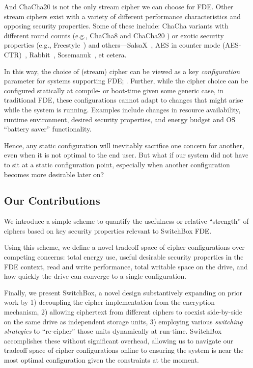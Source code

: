 And ChaCha20 is not the only stream cipher we can choose for FDE. Other stream
ciphers exist with a variety of different performance characteristics and
opposing security properties. Some of these include: ChaCha variants with
different round counts (e.g., ChaCha8 \cite{ChaCha8} and ChaCha20
\cite{ChaCha20}) or exotic security properties (e.g.,
Freestyle~\cite{Freestyle}) and others---SalsaX~\cite{SalsaX}, AES in counter
mode (AES-CTR)~\cite{AES-CTR}, Rabbit~\cite{Rabbit}, Sosemanuk~\cite{Sosemanuk},
et cetera.

In this way, the choice of (stream) cipher can be viewed as a key
\emph{configuration} parameter for systems supporting FDE; . Further, while the cipher choice can be configured
statically at compile- or boot-time given some generic case, in traditional FDE,
these configurations cannot adapt to changes that might arise while the system
is running. Examples include changes in resource availability, runtime
environment, desired security properties, and energy budget and OS ``battery
saver'' functionality.

Hence, any static configuration will inevitably sacrifice one concern for
another, even when it is not optimal to the end user. But what if our system did
not have to sit at a static configuration point, especially when another
configuration becomes more desirable later on?

\subsection{Our Contributions}

We introduce a simple scheme to quantify the usefulness or relative ``strength''
of ciphers based on key security properties relevant to SwitchBox FDE.

Using this scheme, we define a novel tradeoff space of cipher configurations
over competing concerns: total energy use, useful desirable security properties
in the FDE context, read and write performance, total writable space on the
drive, and how quickly the drive can converge to a single configuration.

Finally, we present SwitchBox, a novel design substantively expanding on prior
work by 1) decoupling the cipher implementation from the encryption mechanism,
2) allowing ciphertext from different ciphers to coexist side-by-side on the
same drive as independent storage units, 3) employing various \emph{switching
strategies} to ``re-cipher'' those units dynamically at run-time. SwitchBox
accomplishes these without significant overhead, allowing us to navigate our
tradeoff space of cipher configurations online to ensuring the system is near
the most optimal configuration given the constraints at the moment.


